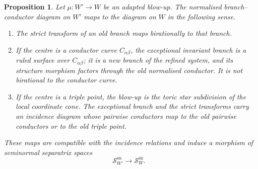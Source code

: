 \documentclass[11pt]{amsart}
\numberwithin{equation}{section}
\theoremstyle{plain}
\newtheorem{Proposition}[Theorem]{Proposition}
\theoremstyle{definition}
\newcommand{\sn}{\mathrm{sn}}
\newcommand{\sS}{\mathscr S}
\begin{document}
\begin{center}
\qquad
{}
\end{center}

\begin{Proposition}
\label{prop:branch-functoriality}
Let $\mu:W'\to W$ be an adapted blow-up.  The normalised branch--conductor diagram on $W'$ maps to the diagram on $W$ in the following sense.
\begin{enumerate}[label=\textup{(\roman*)},leftmargin=2.4em]
\item The strict transform of an old branch maps birationally to that branch.
\item If the centre is a conductor curve $C_{\alpha\beta}$, the exceptional invariant branch is a ruled surface over $C_{\alpha\beta}$; it is a new branch of the refined system, and its structure morphism factors through the old normalised conductor.  It is not birational to the conductor curve.
\item If the centre is a triple point, the blow-up is the toric star subdivision of the local coordinate cone.  The exceptional branch and the strict transforms carry an incidence diagram whose pairwise conductors map to the old pairwise conductors or to the old triple point.
\end{enumerate}
These maps are compatible with the incidence relations and induce a morphism of seminormal separatrix spaces
\[
\sS^{\sn}_{W'}\to \sS^{\sn}_{W}.
\]
\end{Proposition}
\end{document}
